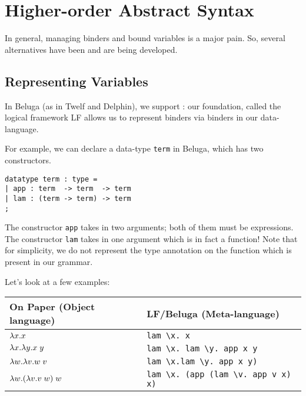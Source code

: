 \section{Higher-order Abstract Syntax}\label{sec:HOAS}
In general, managing binders and bound variables is a major pain. So,
several alternatives have been and are being developed.

\subsection{Representing Variables}\label{sec:HOAS-var}
In Beluga (as in Twelf and Delphin), we support : our foundation, called the logical framework LF
\cite{Harper93jacm} allows us to represent binders via binders in our
data-language.

For example, we can declare a data-type \lstinline!term! in Beluga,
which has two constructors.

\begin{lstlisting}
datatype term : type =
| app : term  -> term  -> term
| lam : (term -> term) -> term
;
\end{lstlisting}

The constructor \lstinline!app! takes in two arguments; both of them
must be expressions. The constructor \lstinline!lam! takes in one
argument which is in fact a function! Note that for simplicity, we do
not represent the type annotation on the function which is present in
our grammar.

Let's look at a few examples:
\begin{center}
\begin{tabular}{l@{\quad}|@{\quad}l}
  On Paper (Object language) & LF/Beluga (Meta-language)\\
  \hline
  $\lambda x.x$ & \lstinline!lam \x. x! \\
  $\lambda x.\lambda y. x \; y$ &
  \lstinline!lam \x. lam \y. app x y! \\
  $\lambda w.\lambda v. w \; v$ &
  \lstinline!lam \x.lam \y. app x y)! \\
  $\lambda w. (\lambda v. v \; w) \; w$
  & \lstinline!lam \x. (app (lam \v. app v x) x)!
\end{tabular}
\end{center}


